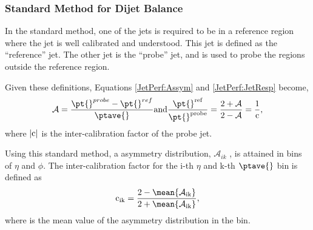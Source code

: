 \subsubsection{Standard Method for Dijet Balance}

In the standard method, one of the jets is required to be in a reference region where the jet is well calibrated and understood.
This jet is defined as the ``reference'' jet.
The other jet is the ``probe'' jet, and is used to probe the regions outside the reference region.


Given these definitions, Equations \ref{JetPerf:Assym} and \ref{JetPerf:JetResp} become,
\begin{equation}
\mathcal{A} =\frac{\pt{}^{probe} - \pt{}^{ref}}{\ptave{}}
\rm{ and } 
\frac{\pt{}^{ref}}{\pt{}^{probe}}=\frac{2+\mathcal{A}}{2-\mathcal{A}}=\frac{1}{\rm c},
\label{JetPerf:SM_Eqn}
\end{equation}
where $|\rm c|$ is the inter-calibration factor of the probe jet.  

Using this standard method, a asymmetry distribution, $\mathcal{A}_{ik}$ , is attained in bins of $\eta$ and $\phi$.
The inter-calibration factor for the i-th $\eta$ and k-th $\ptave{}$ bin is defined as
\begin{equation}
\rm{c_{ik}} =\frac{2-\mean{\mathcal{A}_{ik}}}{2+\mean{\mathcal{A}_{ik}}},
\label{JetPerf:SM_CorrectionFactor}
\end{equation}
where  is the mean value of the asymmetry distribution in the bin.

